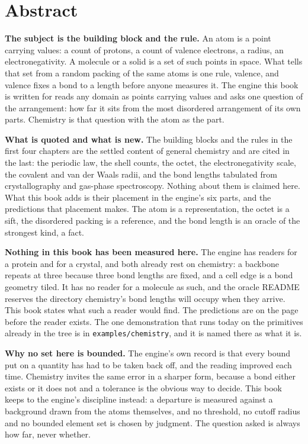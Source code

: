 \chapter*{Abstract}

\textbf{The subject is the building block and the rule.} An atom is a point carrying values: a
count of protons, a count of valence electrons, a radius, an electronegativity. A molecule or a
solid is a set of such points in space. What tells that set from a random packing of the same atoms
is one rule, valence, and valence fixes a bond to a length before anyone measures it. The engine
this book is written for reads any domain as points carrying values and asks one question of the
arrangement: how far it sits from the most disordered arrangement of its own parts. Chemistry is
that question with the atom as the part.

\textbf{What is quoted and what is new.} The building blocks and the rules in the first four
chapters are the settled content of general chemistry and are cited in the last: the periodic law,
the shell counts, the octet, the electronegativity scale, the covalent and van der Waals radii, and
the bond lengths tabulated from crystallography and gas-phase spectroscopy. Nothing about them is
claimed here. What this book adds is their placement in the engine's six parts, and the predictions
that placement makes. The atom is a representation, the octet is a sift, the disordered packing is a
reference, and the bond length is an oracle of the strongest kind, a fact.

\textbf{Nothing in this book has been measured here.} The engine has readers for a protein and for a
crystal, and both already rest on chemistry: a backbone repeats at three because three bond lengths
are fixed, and a cell edge is a bond geometry tiled. It has no reader for a molecule as such, and
the oracle README reserves the directory chemistry's bond lengths will occupy when they arrive. This
book states what such a reader would find. The predictions are on the page before the reader
exists. The one demonstration that runs today on the primitives already in the tree is in
\texttt{examples/chemistry}, and it is named there as what it is.

\textbf{Why no set here is bounded.} The engine's own record is that every bound put on a quantity
has had to be taken back off, and the reading improved each time. Chemistry invites the same error
in a sharper form, because a bond either exists or it does not and a tolerance is the obvious way to
decide. This book keeps to the engine's discipline instead: a departure is measured against a
background drawn from the atoms themselves, and no threshold, no cutoff radius and no bounded element
set is chosen by judgment. The question asked is always how far, never whether.
